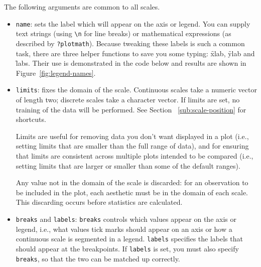 The following arguments are common to all scales.

\begin{itemize}
  \item {\tt name}:  sets the label which will appear on the axis or legend. You can supply text strings (using \verb|\n| for line breaks) or mathematical expressions (as described by \verb|?plotmath|).  Because tweaking these labels is such a common task, there are three helper functions to save you some typing: \f{xlab}, \f{ylab} and \f{labs}.  Their use is demonstrated in the code below and results are shown in Figure~\ref{fig:legend-names}.

    

  \item {\tt limits}: fixes the domain of the scale.   Continuous scales take a numeric vector of length two; discrete scales take a character vector. If limits are set, no training of the data will be performed.  See Section~ \ref{sub:scale-position} for shortcuts.
  
  Limits are useful for removing data you don't want displayed in a plot (i.e., setting limits that are smaller than the full range of data), and for ensuring that limits are consistent across multiple plots intended to be compared (i.e., setting limits that are larger or smaller than some of the default ranges).  
  
  Any value not in the domain of the scale is discarded: for an observation to be included in the plot, each aesthetic must be in the domain of each scale.  This discarding occurs before statistics are calculated. 
  
  \item {\tt breaks} and {\tt labels}: {\tt breaks} controls which values appear on the axis or legend, i.e., what values tick marks should appear on an axis or how a continuous scale is segmented in a legend. {\tt labels} specifies the labels that should appear at the breakpoints. If {\tt labels} is set, you must also specify {\tt breaks}, so that the two can be matched up correctly.


\end{itemize}
